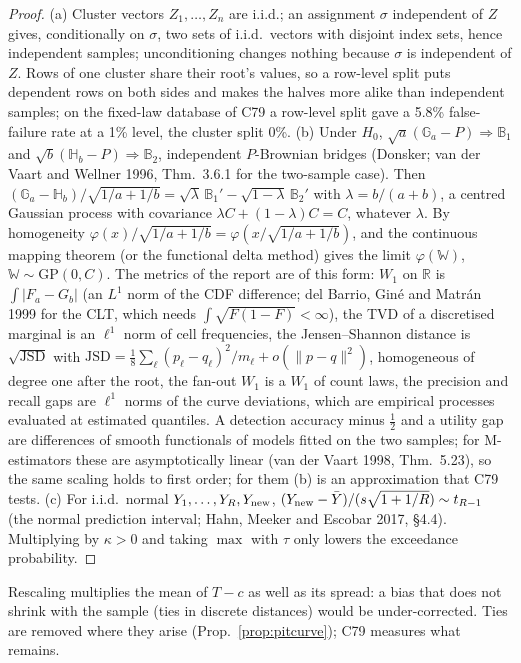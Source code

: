 \begin{proof}
(a) Cluster vectors $Z_1,\dots,Z_n$ are i.i.d.; an assignment $\sigma$ independent of $Z$ gives, conditionally on $\sigma$, two sets of i.i.d.\ vectors with disjoint index sets, hence independent samples; unconditioning changes nothing because $\sigma$ is independent of $Z$. Rows of one cluster share their root's values, so a row-level split puts dependent rows on both sides and makes the halves more alike than independent samples; on the fixed-law database of C79 a row-level split gave a 5.8\% false-failure rate at a 1\% level, the cluster split 0\%.
(b) Under $H_0$, $\sqrt{a}(\mathbb{G}_a-P)\Rightarrow\mathbb{B}_1$ and $\sqrt{b}(\mathbb{H}_b-P)\Rightarrow\mathbb{B}_2$, independent $P$-Brownian bridges (Donsker; van der Vaart and Wellner 1996, Thm.~3.6.1 for the two-sample case). Then $(\mathbb{G}_a-\mathbb{H}_b)/\sqrt{1/a+1/b}=\sqrt{\lambda}\,\mathbb{B}_1'-\sqrt{1-\lambda}\,\mathbb{B}_2'$ with $\lambda=b/(a+b)$, a centred Gaussian process with covariance $\lambda C+(1-\lambda)C=C$, whatever $\lambda$. By homogeneity $\varphi(x)/\sqrt{1/a+1/b}=\varphi(x/\sqrt{1/a+1/b})$, and the continuous mapping theorem (or the functional delta method) gives the limit $\varphi(\mathbb{W})$, $\mathbb{W}\sim\mathrm{GP}(0,C)$. The metrics of the report are of this form: $W_1$ on $\mathbb{R}$ is $\int|F_a-G_b|$ (an $L^1$ norm of the CDF difference; del Barrio, Gin\'e and Matr\'an 1999 for the CLT, which needs $\int\sqrt{F(1-F)}<\infty$), the TVD of a discretised marginal is an $\ell^1$ norm of cell frequencies, the Jensen--Shannon distance is $\sqrt{\mathrm{JSD}}$ with $\mathrm{JSD}=\tfrac18\sum_\ell(p_\ell-q_\ell)^2/m_\ell+o(\|p-q\|^2)$, homogeneous of degree one after the root, the fan-out $W_1$ is a $W_1$ of count laws, the precision and recall gaps are $\ell^1$ norms of the curve deviations, which are empirical processes evaluated at estimated quantiles. A detection accuracy minus $\tfrac12$ and a utility gap are differences of smooth functionals of models fitted on the two samples; for M-estimators these are asymptotically linear (van der Vaart 1998, Thm.~5.23), so the same scaling holds to first order; for them (b) is an approximation that C79 tests.
(c) For i.i.d.\ normal $Y_1,\dots,Y_R,Y_{\rm new}$, $(Y_{\rm new}-\bar Y)/(s\sqrt{1+1/R})\sim t_{R-1}$ (the normal prediction interval; Hahn, Meeker and Escobar 2017, \S4.4). Multiplying by $\kappa>0$ and taking $\max$ with $\tau$ only lowers the exceedance probability.
\end{proof}
\noindent Rescaling multiplies the mean of $T-c$ as well as its spread: a bias that does not shrink with the sample (ties in discrete distances) would be under-corrected. Ties are removed where they arise (Prop.~\ref{prop:pitcurve}); C79 measures what remains.

